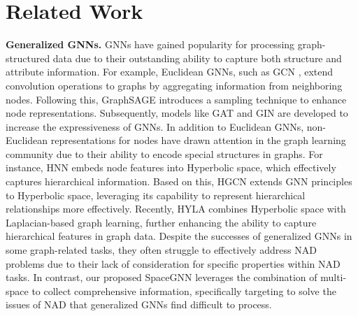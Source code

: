 \section{Related Work}
\label{sec:relatedwork}

{\bf Generalized GNNs.} GNNs have gained popularity for processing graph-structured data due to their outstanding ability to capture both structure and attribute information. For example, Euclidean GNNs, such as GCN \citep{gcn17kipf}, extend convolution operations to graphs by aggregating information from neighboring nodes. Following this, GraphSAGE \citep{graphsage17hamilton} introduces a sampling technique to enhance node representations. Subsequently, models like GAT \citep{gat18velickovic} and GIN \citep{gin19xu} are developed to increase the expressiveness of GNNs. In addition to Euclidean GNNs, non-Euclidean representations for nodes have drawn attention in the graph learning community due to their ability to encode special structures in graphs. For instance, HNN \citep{hnn18ganea} embeds node features into Hyperbolic space, which effectively captures hierarchical information. Based on this, HGCN \citep{hgcn19chami} extends GNN principles to Hyperbolic space, leveraging its capability to represent hierarchical relationships more effectively. Recently, HYLA \citep{hyla23yu} combines Hyperbolic space with Laplacian-based graph learning, further enhancing the ability to capture hierarchical features in graph data. Despite the successes of generalized GNNs in some graph-related tasks, they often struggle to effectively address NAD problems due to their lack of consideration for specific properties within NAD tasks. In contrast, our proposed SpaceGNN leverages the combination of multi-space to collect comprehensive information, specifically targeting to solve the issues of NAD that generalized GNNs find difficult to process. 

